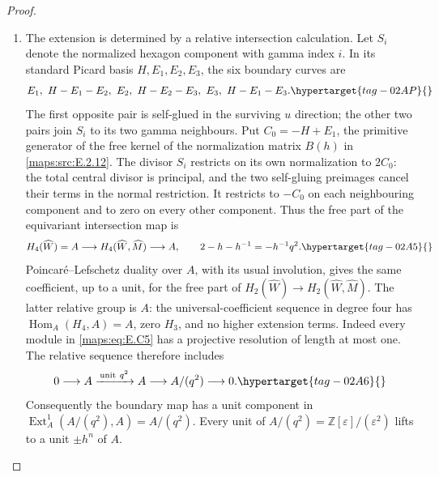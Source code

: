 \documentclass[11pt,a4paper]{article}
\numberwithin{equation}{section}
\theoremstyle{definition}
\begin{document}
\begin{proof}
\begin{enumerate}[label=\arabic*.,leftmargin=*]
\item The extension is determined by a relative intersection calculation. Let $S_i$ denote the normalized hexagon
component with gamma index $i$. In its standard Picard
basis $H,E_1,E_2,E_3$, the six boundary curves are
\begin{equation}
 E_1,\ H-E_1-E_2,\ E_2,\ H-E_2-E_3,
                       \ E_3,\ H-E_1-E_3.
 \hypertarget{tag-02AP}{}\label{maps:eq:E.C9}
\end{equation}
The first opposite pair is self-glued in the surviving
$u$ direction; the other two pairs join $S_i$ to its
two gamma neighbours. Put $C_0=-H+E_1$, the primitive
generator of the free kernel of the normalization matrix
$B(h)$ in \ref{maps:src:E.2.12}. The divisor $S_i$ restricts on its
own normalization to $2C_0$: the total central divisor
is principal, and the two self-gluing preimages cancel
their terms in the normal restriction. It restricts
to $-C_0$ on each neighbouring component and to zero
on every other component. Thus the free part of the
equivariant intersection map is
\begin{equation}
 H_4(\widehat W)=A\longrightarrow
 H_4(\widehat W,\widehat M)\longrightarrow A,
 \qquad 2-h-h^{-1}=-h^{-1}q^2.
 \hypertarget{tag-02A5}{}\label{maps:eq:E.C10}
\end{equation}
Poincar\'e--Lefschetz duality over $A$, with its usual
involution, gives the same coefficient, up to a unit,
for the free part of $H_2(\widehat W)\to
H_2(\widehat W,\widehat M)$. The latter relative group
is $A$: the universal-coefficient sequence in degree
four has $\operatorname{Hom}_A(H_4,A)=A$, zero $H_3$,
and no higher extension terms. Indeed every module
in \eqref{maps:eq:E.C5} has a projective resolution of length at
most one. The relative sequence therefore includes
\begin{equation}
 0\longrightarrow A\xrightarrow{\,\text{unit}\ q^2\,}A
  \longrightarrow A/(q^2)\longrightarrow0.
 \hypertarget{tag-02A6}{}\label{maps:eq:E.C11}
\end{equation}
Consequently the boundary map has a unit component in
$\operatorname{Ext}^1_A(A/(q^2),A)=A/(q^2)$.
Every unit of $A/(q^2)=\mathbb Z[\varepsilon]/(\varepsilon^2)$
lifts to a unit $\pm h^n$ of $A$.


\end{enumerate}
\end{proof}
\end{document}
